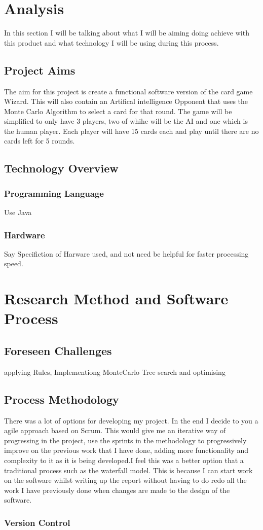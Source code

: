 \section{Analysis}
In this section I will be talking about what I will be aiming doing achieve with this product and what technology I will be using during this process. 
\subsection{Project Aims}
The aim for this project is create a functional software version of the card game Wizard. This will also contain an Artifical intelligence Opponent that uses the Monte Carlo Algorithm to select a card for that round. The game will be simplified to only have 3 players, two of whihc will be the AI and one which is the human player. Each player will have 15 cards each and play until there are no cards left for 5 rounds. 
\subsection {Technology Overview}
\subsubsection{Programming Language}
Use Java
\subsubsection{Hardware}
Say Specifiction of Harware used, and not need be helpful for faster processing speed.
\section{Research Method and Software Process}
\subsection {Foreseen Challenges}
applying Rules, Implementiong MonteCarlo Tree search and optimising
\subsection {Process Methodology}
There was a lot of options for developing my project. In the end I decide to you a agile approach based on Scrum. This would give me an iterative way of progressing in the project, use the sprints in the methodology to progressively improve on the previous work that I have done, adding more functionality and complexity to it as it is being developed.I feel this was a better option that a traditional process such as the waterfall model. This is because I can start work on the software whilst writing up the report without having to do redo all the work I have previously done when changes are made to the design of the software.
\subsubsection{Version Control}


